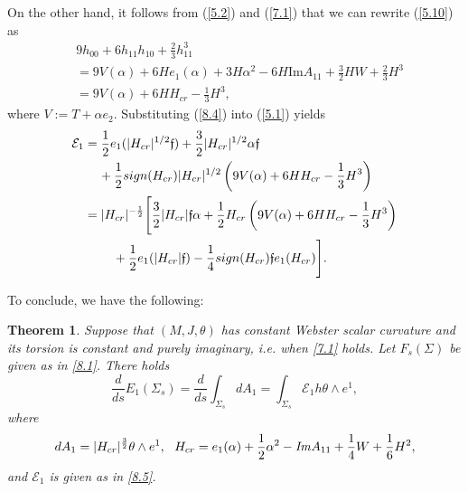 \documentclass{amsart}
\newtheorem{theorem}{Theorem}[section]
\theoremstyle{Corollary}
\numberwithin{equation}{section}
\begin{document}
On the other hand, it follows from (\ref{5.2}) and (\ref{7.1})
that we can rewrite (\ref{5.10}) as 
\begin{equation}\label{8.4}
\begin{split}
&9h_{00}+6h_{11}h_{10}+\frac{2}{3}h_{11}^3\\
&=9V(\alpha) +6He_1(\alpha)+3H\alpha^2-6H\mbox{Im} A_{11}+\frac{3}{2}HW+\frac{2}{3}H^3\\
&=9V(\alpha)+6H H_{cr}-\frac{1}{3}H^3, 
\end{split}
\end{equation}
where $V:=T+\alpha e_2$. 
Substituting (\ref{8.4}) into (\ref{5.1}) yields 
\begin{align}\label{8.5}
\begin{split}
\mathcal{E}_1&=\frac{1}{2}e_1(|H_{cr}|^{1/2}\mathfrak{f})+\frac{3}{2}|H_{cr}|^{1/2}\alpha\mathfrak{f}\\
&\hspace{4mm}+\frac{1}{2}sign(H_{cr})|H_{cr}|^{1/2}\left(9V(\alpha)+6H H_{cr}-\frac{1}{3}H^3\right)\\
&=|H_{cr}|^{-\frac{1}{2}}\Bigg[\frac{3}{2}|H_{cr}|\mathfrak{f}\alpha+\frac{1}{2}H_{cr}\left(9V(\alpha)+6H H_{cr}-\frac{1}{3}H^3\right)\\
&\hspace{8mm}+\frac{1}{2}e_1(|H_{cr}|\mathfrak{f})-\frac{1}{4}sign(H_{cr})\mathfrak{f}e_1(H_{cr})\Bigg].
\end{split}
\end{align}

To conclude, we have the following: 

\begin{theorem}
Suppose that  $(M,J,\theta)$
has constant Webster scalar curvature and 
its torsion is constant and purely imaginary, i.e. when \eqref{7.1} holds.
Let $F_s(\Sigma)$ be given as in \eqref{8.1}. There holds 
\begin{equation}\label{8.6}
\frac{d}{ds}E_1(\Sigma_s)=\frac{d}{ds}\int_{\Sigma_s}dA_1
=\int_{\Sigma_s}\mathcal{E}_1 h \theta\wedge e^1,
\end{equation}
where 
$$dA_1=|H_{cr}|^{\frac{3}{2}}\theta\wedge e^1,~~
H_{cr}=e_1(\alpha)+\frac{1}{2}\alpha^2-\mbox{\emph{Im}} A_{11}+\frac{1}{4}W+\frac{1}{6}H^2,$$
and $\mathcal{E}_1$ is given as in \eqref{8.5}. 
\end{theorem}
\end{document}
